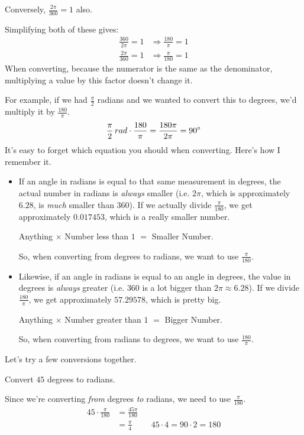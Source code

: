 Conversely, $\frac{2\pi}{360} = 1$ also.

Simplifying both of these gives:
\begin{align*}
    \frac{360}{2\pi} = 1 &\Longrightarrow \frac{180}{\pi} = 1 \\
    \frac{2\pi}{360} = 1 &\Longrightarrow \frac{\pi}{180} = 1
\end{align*}
When converting, because the numerator is the same as the denominator, multiplying a value by this factor doesn't change it.

For example, if we had $\frac{\pi}{2}$ radians and we wanted to convert this to degrees, we'd multiply it by $\frac{180}{\pi}$.
\begin{align*}
    \frac{\pi}{2}\,rad  \cdot \frac{180}{\pi} &= \frac{180\pi}{2\pi} = 90\degree \\
\end{align*}
It's easy to forget which equation you should when converting. Here's how I remember it.
\begin{itemize}
    \item If an angle in radians is equal to that same measurement in degrees, the actual number in radians is \textit{always} smaller (i.e. $2\pi$, which is approximately $6.28$, is \textit{much} smaller than $360$). If we actually divide $\frac{\pi}{180}$, we get approximately $0.017453$, which is a really smaller number.
    
    Anything $\times$ Number less than $1$ $=$ Smaller Number.

    So, when converting from degrees to radians, we want to use $\frac{\pi}{180}$.

    \item Likewise, if an angle in radians is equal to an angle in degrees, the value in degrees is \textit{always} greater (i.e. $360$ is a lot bigger than $2\pi \approx 6.28$). If we divide $\frac{180}{\pi}$, we get approximately $57.29578$, which is pretty big.
    
    Anything $\times$ Number greater than $1$ $=$ Bigger Number.

    So, when converting from radians to degrees, we want to use $\frac{180}{\pi}$.
\end{itemize}
Let's try a few conversions together.
\begin{problem}
    Convert $45$ degrees to radians.
\end{problem}
\begin{solution}
    Since we're converting \textit{from} degrees \textit{to} radians, we need to use $\frac{\pi}{180}$.
    \begin{align*}
        45 \cdot \frac{\pi}{180} &= \frac{45\pi}{180}\\
        &= \frac{\pi}{4} && 45 \cdot 4 = 90 \cdot 2 = 180
    \end{align*}
\end{solution}
